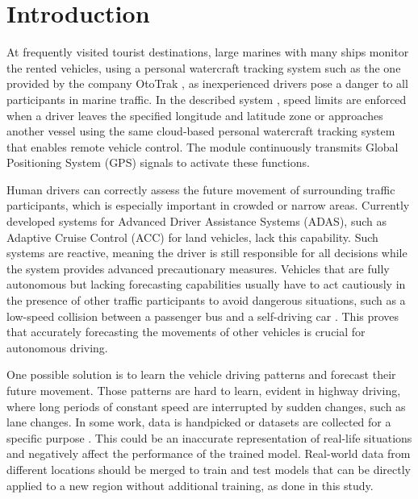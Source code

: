 \documentclass[preprint,12pt]{elsarticle}
\begin{document}


\section{Introduction}

At frequently visited tourist destinations, large marines with many ships monitor the rented vehicles, using a personal watercraft tracking system such as the one provided by the company OtoTrak \cite{ototrakOtoTrakTrack}, as inexperienced drivers pose a danger to all participants in marine traffic. In the described system \cite{ototrakOtoTrakTrack}, speed limits are enforced when a driver leaves the specified longitude and latitude zone or approaches another vessel using the same cloud-based personal watercraft tracking system that enables remote vehicle control. The module \cite{ototrakOtoTrakTrack} continuously transmits Global Positioning System (GPS) signals to activate these functions.

Human drivers can correctly assess the future movement of surrounding traffic participants, which is especially important in crowded or narrow areas. Currently developed systems for Advanced Driver Assistance Systems (ADAS), such as Adaptive Cruise Control (ACC) for land vehicles, lack this capability. Such systems are reactive, meaning the driver is still responsible for all decisions while the system provides advanced precautionary measures. Vehicles that are fully autonomous but lacking forecasting capabilities usually have to act cautiously in the presence of other traffic participants to avoid dangerous situations, such as a low-speed collision between a passenger bus and a self-driving car \citep{dolgov2016google}. This proves that accurately forecasting the movements of other vehicles is crucial for autonomous driving.

One possible solution is to learn the vehicle driving patterns and forecast their future movement. Those patterns are hard to learn, evident in highway driving, where long periods of constant speed are interrupted by sudden changes, such as lane changes. In some work, data is handpicked \citep{ding2013neural, zheng2014predicting} or datasets are collected for a specific purpose \citep{kumar2013learning}. This could be an inaccurate representation of real-life situations and negatively affect the performance of the trained model. Real-world data from different locations should be merged to train and test models that can be directly applied to a new region without additional training, as done in this study.
\end{document}
